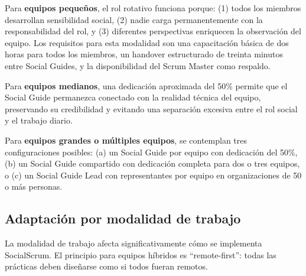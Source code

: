 Para \textbf{equipos pequeños}, el rol rotativo funciona porque:
(1) todos los miembros desarrollan sensibilidad social,
(2) nadie carga permanentemente con la responsabilidad del rol, y
(3) diferentes perspectivas enriquecen la observación del equipo.
Los requisitos para esta modalidad son una capacitación básica de dos horas para todos los miembros,
un handover estructurado de treinta minutos entre Social Guides,
y la disponibilidad del Scrum Master como respaldo.

Para \textbf{equipos medianos}, una dedicación aproximada del 50\% permite que el Social Guide
permanezca conectado con la realidad técnica del equipo, preservando su credibilidad
y evitando una separación excesiva entre el rol social y el trabajo diario.

Para \textbf{equipos grandes o múltiples equipos}, se contemplan tres configuraciones posibles:
(a) un Social Guide por equipo con dedicación del 50\%,
(b) un Social Guide compartido con dedicación completa para dos o tres equipos, o
(c) un Social Guide Lead con representantes por equipo en organizaciones de 50 o más personas.

\subsection{Adaptación por modalidad de trabajo}

La modalidad de trabajo afecta significativamente cómo se implementa SocialScrum. El principio para equipos híbridos es ``remote-first'': todas las prácticas deben diseñarse como si todos fueran remotos.

